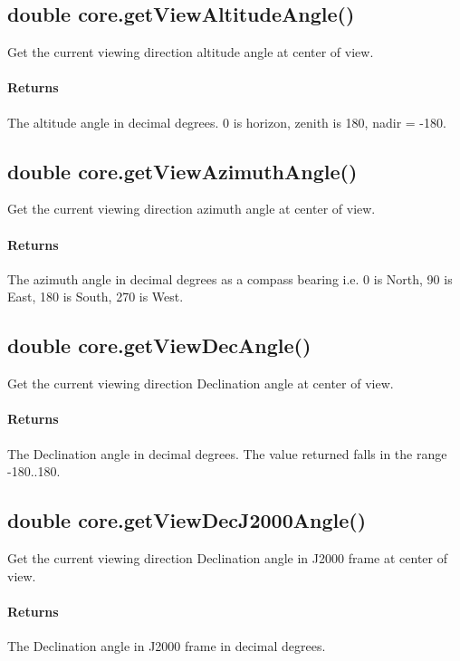 \subsection{double core.getViewAltitudeAngle()}
\label{sec:ScriptingAPI:core:getViewAltitudeAngle}
Get the current viewing direction altitude angle at center of view.

\paragraph{Returns}
The altitude angle in decimal degrees. 0 is horizon, zenith is 180, nadir = -180.

\subsection{double core.getViewAzimuthAngle()}
\label{sec:ScriptingAPI:core:getViewAzimuthAngle}
Get the current viewing direction azimuth angle at center of view.

\paragraph{Returns}
The azimuth angle in decimal degrees as a compass bearing i.e. 0 is North, 90 is East, 180 is South, 270 is West.

\subsection{double core.getViewDecAngle()}
\label{sec:ScriptingAPI:core:getViewDecAngle}
Get the current viewing direction Declination angle at center of view.

\paragraph{Returns}
The Declination angle in decimal degrees. The value returned falls in the range -180..180.

\subsection{double core.getViewDecJ2000Angle()}
\label{sec:ScriptingAPI:core:getViewDecJ2000Angle}
Get the current viewing direction Declination angle in J2000 frame at center of view.

\paragraph{Returns}
The Declination angle in J2000 frame in decimal degrees.

